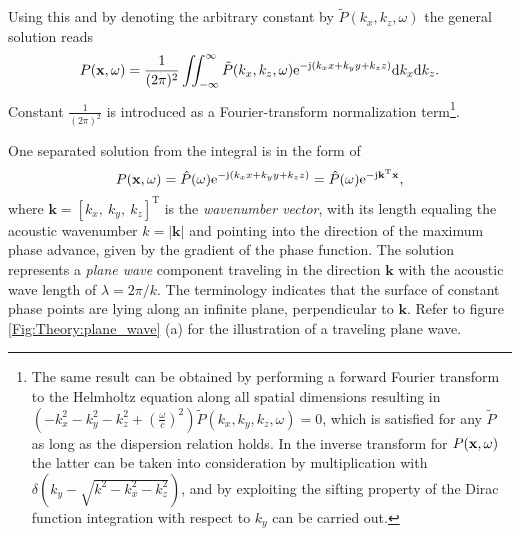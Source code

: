 Using this and by denoting the arbitrary constant by $\tilde{P}(k_x,k_z, \omega)$ the general solution reads
\begin{equation}
P(\mathbf{x},\omega) = \frac{1}{(2\pi)^2}\iint_{-\infty}^{\infty} \tilde{P}(k_x,k_z, \omega)  \mathrm{e}^{- \mathrm{j} \left( k_x x + k_y y + k_z z \right) }
\mathrm{d} k_x\mathrm{d} k_z.
\label{Eq:Theory:Helmholtz_Inverse_Fourier}
\end{equation}
Constant $\frac{1}{(2\pi)^2}$ is introduced as a Fourier-transform normalization term\footnote{The same result can be obtained by performing a forward Fourier transform to the Helmholtz equation along all spatial dimensions resulting in $\left(-k_x^2 -k_y^2 -k_z^2 + \left(\frac{\omega}{c}\right)^2 \right)\tilde{P}(k_x,k_y,k_z,\omega) = 0$, which is satisfied for any $\tilde{P}$ as long as the dispersion relation holds. In the inverse transform for $P(\mathbf{x},\omega)$ the latter can be taken into consideration by multiplication with $\delta(k_y - \sqrt{k^2-k_x^2-k_z^2})$, and by exploiting the sifting property of the Dirac function integration with respect to $k_y$ can be carried out.}.

\vspace{3mm}
One separated solution from the integral is in the form of \cite{Williams1999}
\begin{equation}
P(\mathbf{x},\omega) = \hat{P}(\omega) \mathrm{e}^{-\mathrm{j} \left( k_x x + k_y y + k_z z \right) } =  \hat{P}(\omega) \mathrm{e}^{-\mathrm{j} \mathbf{k}^{\mathrm{T}} \mathbf{x} },
\end{equation}
where $\mathbf{k} = [k_x,\ k_y,\ k_z]^{\mathrm{T}}$ is the \emph{wavenumber vector}, with its length equaling the acoustic wavenumber $k = | \mathbf{k}|$ and pointing into the direction of the maximum phase advance, given by the gradient of the phase function.
The solution represents a \emph{plane wave} component traveling in the direction $\mathbf{k}$ with the acoustic wave length of $\lambda = 2\pi/k$. The terminology indicates that the surface of constant phase points are lying along an infinite plane, perpendicular to $\mathbf{k}$. Refer to figure \ref{Fig:Theory:plane_wave} (a) for the illustration of a traveling plane wave.

